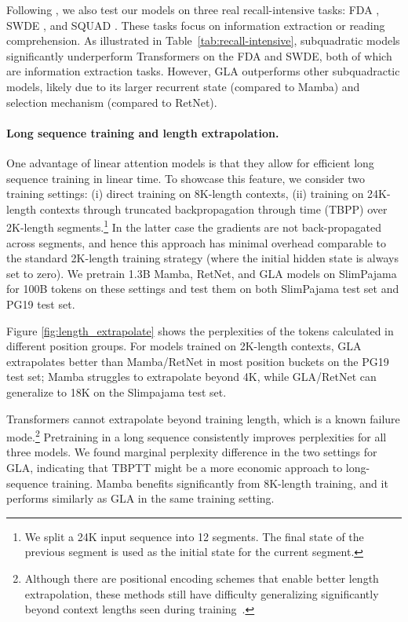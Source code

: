 Following \citet{Arora2024SimpleLA}, we also test our models on three real recall-intensive tasks: FDA \cite{arora_language_2023}, SWDE \cite{lockard_openceres_2019}, and SQUAD \cite{rajpurkar_know_2018}. These tasks focus on information extraction or reading comprehension. As illustrated in Table~\ref{tab:recall-intensive}, subquadratic models significantly underperform Transformers on the FDA and SWDE, both of which are information extraction tasks. However, GLA outperforms other subquadractic models, likely due to its larger recurrent state (compared to Mamba) and selection mechanism (compared to RetNet).

\paragraph{Long sequence training and length extrapolation.} One advantage of linear attention models is that they allow for efficient long sequence training in linear time. To showcase this feature, we consider two training settings: (i) direct training on 8K-length contexts, (ii) training on 24K-length contexts through {truncated backpropagation through time} (TBPP) over 2K-length segments.\footnote{We split a 24K input sequence into 12 segments. The final state of the previous segment is used as the initial state for the current segment.} In the latter case the gradients are not back-propagated across segments, and hence this approach has minimal overhead comparable to the standard 2K-length training strategy (where the initial hidden state is always set to zero). We pretrain 1.3B Mamba, RetNet, and GLA models on SlimPajama for 100B tokens on these settings and test them on both SlimPajama test set and PG19 \citep{pg19} test set. 

Figure \ref{fig:length_extrapolate} shows the perplexities of the tokens calculated in different position groups.  For models trained on 2K-length contexts, GLA extrapolates better than Mamba/RetNet in most position buckets on the PG19 test set; Mamba struggles to extrapolate beyond 4K, while GLA/RetNet can generalize to 18K on the Slimpajama test set.

Transformers cannot extrapolate beyond training length, which is a known failure mode.\footnote
{Although there are positional encoding schemes that enable better length extrapolation, these methods still have difficulty generalizing significantly beyond context lengths seen during training~\citep{alibi2021,xpos,fire2024}.} Pretraining in a long sequence consistently improves perplexities for all three models. We found marginal perplexity difference in the two settings for GLA, indicating that TBPTT might be a more economic approach to long-sequence training. Mamba benefits significantly from 8K-length training, and it performs similarly as GLA in the same training setting.


